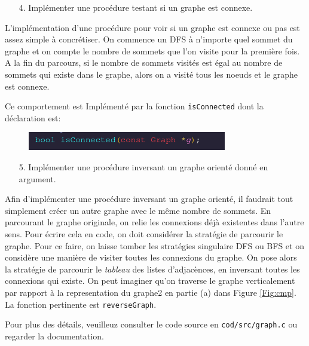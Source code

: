 \documentclass[10pt]{article} %
\begin{document}
\begin{itemize}
    \item [4.] Implémenter une procédure testant si un graphe est connexe.
\end{itemize}

L'implémentation d'une procédure pour voir si un graphe est connexe ou pas est assez simple à concrétiser. On commence un DFS à n'importe quel sommet
du graphe et on compte le nombre de sommets que l'on visite pour la première fois. A la fin du parcours, si le nombre de sommets visités est égal au nombre de
sommets qui existe dans le graphe, alors on a visité tous les noeuds et le graphe est connexe.

Ce comportement est Implémenté par la fonction \texttt{isConnected} dont la déclaration est:

\begin{figure}[h!]
    \centering
    \includegraphics[height=.6cm]{media/isConnected.png}

\end{figure}

\begin{itemize}
    \item [5.] Implémenter une procédure inversant un graphe orienté donné en argument.
\end{itemize}

Afin d'implémenter une procédure inversant un graphe orienté, il faudrait tout simplement créer un autre graphe avec le même nombre de sommets.
En parcourant le graphe originale, on relie les connexions déjà existentes dans l'autre sens. Pour écrire cela en code, on doit considérer la stratégie de
parcourir le graphe. Pour ce faire, on laisse tomber les stratégies singulaire DFS ou BFS et on considère une manière de visiter toutes les connexions du graphe. On pose alors
la stratégie de parcourir le \textit{tableau} des listes d'adjacènces, en inversant toutes les connexions qui existe. On peut imaginer qu'on traverse le graphe verticalement par
rapport à la representation du graphe2 en partie (a) dans Figure \ref{Fig:cmp}. La fonction pertinente est \texttt{reverseGraph}.

Pour plus des détails, veuilleuz consulter le code source en \texttt{cod/src/graph.c} ou regarder la documentation.

\vspace{.5cm}
\noindent {} 
\end{document}
